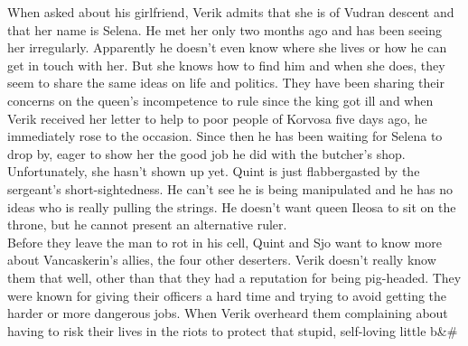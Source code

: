 When asked about his girlfriend, Verik admits that she is of Vudran descent and that her name is Selena. He met her only two months ago and has been seeing her irregularly. Apparently he doesn't even know where she lives or how he can get in touch with her. But she knows how to find him and when she does, they seem to share the same ideas on life and politics. They have been sharing their concerns on the queen's incompetence to rule since the king got ill and when Verik received her letter to help to poor people of Korvosa five days ago, he immediately rose to the occasion. Since then he has been waiting for Selena to drop by, eager to show her the good job he did with the butcher's shop. Unfortunately, she hasn't shown up yet. Quint is just flabbergasted by the sergeant's short-sightedness. He can't see he is being manipulated and he has no ideas who is really pulling the strings. He doesn't want queen Ileosa to sit on the throne, but he cannot present an alternative ruler.\\

Before they leave the man to rot in his cell, Quint and Sjo want to know more about Vancaskerin's allies, the four other deserters. Verik doesn't really know them that well, other than that they had a reputation for being pig-headed. They were known for giving their officers a hard time and trying to avoid getting the harder or more dangerous jobs. When Verik overheard them complaining about having to risk their lives in the riots to protect that stupid, self-loving little b&#\\

